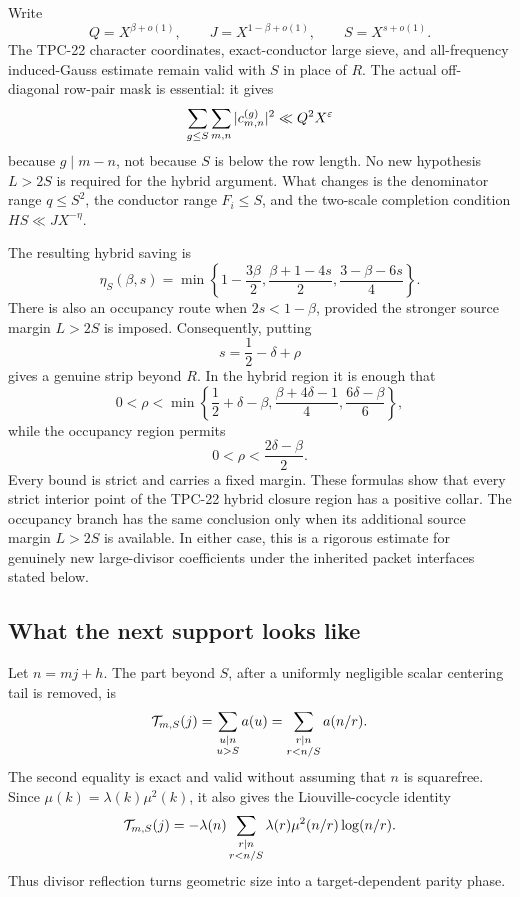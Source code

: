Write
\[
 Q=X^{\beta+o(1)},\qquad J=X^{1-\beta+o(1)},
 \qquad S=X^{s+o(1)}.
\]
The TPC-22 character coordinates, exact-conductor large sieve, and
all-frequency induced-Gauss estimate remain valid with \(S\) in place
of \(R\).  The actual off-diagonal row-pair mask is essential: it gives
\[
 \sum_{g\le S}\sum_{m,n}|c_{m,n}^{(g)}|^2
 \ll Q^2X^\varepsilon
\]
because \(g\mid m-n\), not because \(S\) is below the row length.  No
new hypothesis \(L>2S\) is required for the hybrid argument.  What
changes is the denominator
range \(q\le S^2\), the conductor range \(F_i\le S\), and the
two-scale completion condition \(HS\ll JX^{-\eta}\).

The resulting hybrid saving is
\begin{equation}
 \eta_S(\beta,s)=
 \min\left\{
 1-\frac{3\beta}{2},
 \frac{\beta+1-4s}{2},
 \frac{3-\beta-6s}{4}
 \right\}.
 \label{eq:intro-etaS}
\end{equation}
There is also an occupancy route when \(2s<1-\beta\), provided the
stronger source margin \(L>2S\) is imposed.  Consequently,
putting
\[
 s=\frac12-\delta+\rho
\]
gives a genuine strip beyond \(R\).  In the hybrid region it is enough
that
\begin{equation}
 0<\rho<\min\left\{
 \frac12+\delta-\beta,
 \frac{\beta+4\delta-1}{4},
 \frac{6\delta-\beta}{6}
 \right\},
 \label{eq:intro-rho-hybrid}
\end{equation}
while the occupancy region permits
\begin{equation}
 0<\rho<\frac{2\delta-\beta}{2}.
 \label{eq:intro-rho-occupancy}
\end{equation}
Every bound is strict and carries a fixed margin.  These formulas show
that every strict interior point of the TPC-22 hybrid closure region has
a positive collar.  The occupancy branch has the same conclusion only
when its additional source margin \(L>2S\) is available.  In either
case, this is a rigorous estimate for genuinely new large-divisor
coefficients under the inherited packet interfaces stated below.

\subsection{What the next support looks like}

Let \(n=mj+h\).  The part beyond \(S\), after a uniformly negligible
scalar centering tail is removed, is
\begin{equation}
 \mathcal T_{m,S}(j)
 =\sum_{\substack{u\mid n\\u>S}}a(u)
 =\sum_{\substack{r\mid n\\r<n/S}}a(n/r).
 \label{eq:intro-complement}
\end{equation}
The second equality is exact and valid without assuming that \(n\) is
squarefree.  Since \(\mu(k)=\lambda(k)\mu^2(k)\), it also gives the
Liouville-cocycle identity
\begin{equation}
 \mathcal T_{m,S}(j)
 =-\lambda(n)
 \sum_{\substack{r\mid n\\r<n/S}}
 \lambda(r)\mu^2(n/r)\log(n/r).
 \label{eq:intro-Liouville-cocycle}
\end{equation}
Thus divisor reflection turns geometric size into a target-dependent
parity phase.


